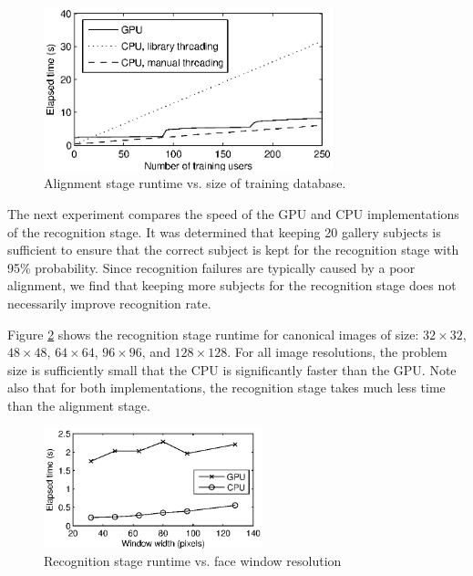 \documentclass[preprint]{sigplanconf}
\begin{document}
\begin{figure}[t!]
\centering
\includegraphics[width=3.3in]{figures/alignment_runtime_graph}\vspace{0.06in}
\caption{Alignment stage runtime vs. size of training database.} \vspace{-0.1in}
\label{fig:alignment_stage_runtime}
\end{figure}

The next experiment compares the speed of the GPU and CPU implementations of
the recognition stage.  It was determined that keeping 20 gallery subjects is
sufficient to ensure that the correct subject is kept for the recognition stage
with 95\% probability.  Since recognition failures are typically caused by a
poor alignment, we find that keeping more subjects for the recognition stage does
not necessarily improve recognition rate.

Figure \ref{fig:recognition_stage_runtime} shows the recognition stage runtime
for canonical images of size: $32\times32$, $48 \times 48$, $64 \times 64$, $96 \times
96$, and $128 \times 128$.  For all image resolutions, the problem size
is sufficiently small that the CPU is significantly faster than the GPU.  Note
also that for both implementations, the recognition stage takes much less time
than the alignment stage.
\begin{figure}[t!]
\centering
\includegraphics[width=2.5in]{figures/speedVsResolution} \vspace{-0.06in}
\caption{Recognition stage runtime vs. face window resolution}\vspace{-0.1in}
\label{fig:recognition_stage_runtime} \end{figure}
\end{document}
